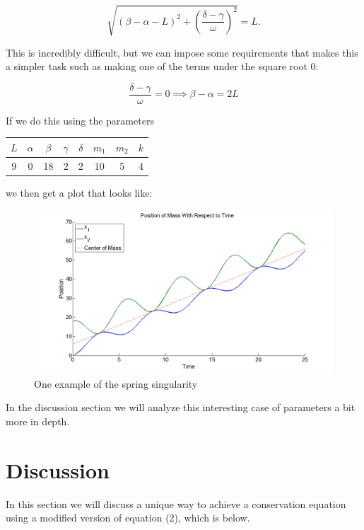\documentclass[11pt, oneside]{article}   	%
\begin{document}
$$\sqrt{(\beta - \alpha -L)^2 + \left(\frac{\delta - \gamma}{\omega}\right)^2}=L.$$

This is incredibly difficult, but we can impose some requirements that makes this a simpler task such as making one of the terms under the square root $0$:

$$\dfrac{\delta - \gamma}{\omega} = 0 \implies \beta - \alpha = 2L$$

If we do this using the parameters

\begin{center}

\begin{tabular}{| c | c | c | c | c | c | c | c |}

\hline

$L$ & $\alpha$ & $\beta$ & $\gamma$ & $\delta$ & $m_1$ & $m_2$ & $k$ \\

\hline

 9 & 0 & 18 & 2 & 2 & 10 & 5 & 4\\

\hline

\end{tabular}

\end{center}

we then get a plot that looks like: \\

\begin{figure}[h!]
\centering \includegraphics[scale=0.3]{spring_sing}
\caption{\label{singularity}One example of the spring singularity}
\end{figure}

In the discussion section we will analyze this interesting case of parameters a bit more in depth.

\section{Discussion}
In this section we will discuss a unique way to achieve a conservation equation using a modified version of equation (2), which is below.
\end{document}
